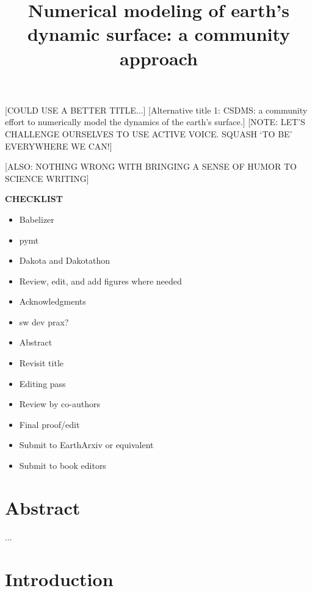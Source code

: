 \documentclass[12pt]{amsart}
\title{Numerical modeling of earth's dynamic surface: a community approach}
\author{}
\date{} %
\begin{document}
\maketitle

[COULD USE A BETTER TITLE...]
[Alternative title 1: CSDMS: a community effort to numerically model the dynamics of the earth’s surface.]
[NOTE: LET'S CHALLENGE OURSELVES TO USE ACTIVE VOICE. SQUASH `TO BE' EVERYWHERE WE CAN!]

[ALSO: NOTHING WRONG WITH BRINGING A SENSE OF HUMOR TO SCIENCE WRITING]


\textbf{CHECKLIST}
\begin{itemize}
    \item Babelizer
    \item pymt
    \item Dakota and Dakotathon
    \item Review, edit, and add figures where needed
    \item Acknowledgments
    \item sw dev prax?
    \item Abstract
    \item Revisit title
    \item Editing pass
    \item Review by co-authors
    \item Final proof/edit
    \item Submit to EarthArxiv or equivalent
    \item Submit to book editors
\end{itemize}

\section*{Abstract}

...


\section{Introduction}
\end{document}
